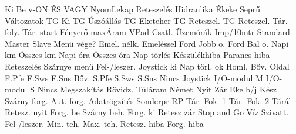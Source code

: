  {Ki}
 {Be}
 {v-ON}
 {ÉS}
 {VAGY}
 {NyomLekap}
 {Reteszelés}
 {Hidraulika}
 {Ékeke}
 {Seprű}
 {Változatok}
 {TG Ki}
 {TG Úszóállás}
 {TG Eketeher}
 {TG Reteszel.}
 {TG Reteszel.}
 {Tár. foly.}
 {Tár. start}
 {Fényerő}
 {maxÁram}
 {VPad Csatl.}
 {Üzemórák}
 {Imp/10mtr}
 {Standard}
 {Master}
 {Slave}
 {Menü vége?}
 {Emel. nélk.}
 {Emeléssel}
 {Ford Jobb o.}
 {Ford Bal o.}
 {Napi km}
 {Összes km}
 {Napi óra}
 {Összes óra}
 {Nap törlés}
 {Készülékhiba}
 {Parancs hiba}
 {Reteszelés}
 {Szárnye menü}
 {Fel-/leszer.}
 {Joystick ki}
 {Nap törl. ok}
 {Homl.}
 {Bőv.}
 {Oldal}
 {F.Pfe}
 {F.Sws}
 {F.Sns}
 {Bőv.}
 {S.Pfe}
 {S.Sws}
 {S.Sns}
 {Nincs}
 {Joystick}
 {I/O-modul M}
 {I/O-modul S}
 {Nincs}
 {Megszakítás}
 {Rövidz.}
 {Túláram}
 {Német}
 {Nyit Zár}
 {Eke b/j}
 {Kész}
 {Szárny forg.}
 {Aut. forg.}
 {Adatrögzítés}
 {Sonderpr RP}
 {Tár. Fok. 1}
 {Tár. Fok. 2}
 {Tárál}
 {Retesz. nyit}
 {Forg. be}
 {Szárny beh.}
 {Forg. ki}
 {Retesz zár}
 {Stop and Go}
 {Víz}
 {Szivatt.}
 {Fel-/leszer.}
 {Min. teh.}
 {Max. teh.}
 {Retesz. hiba}
 {Forg. hiba}


